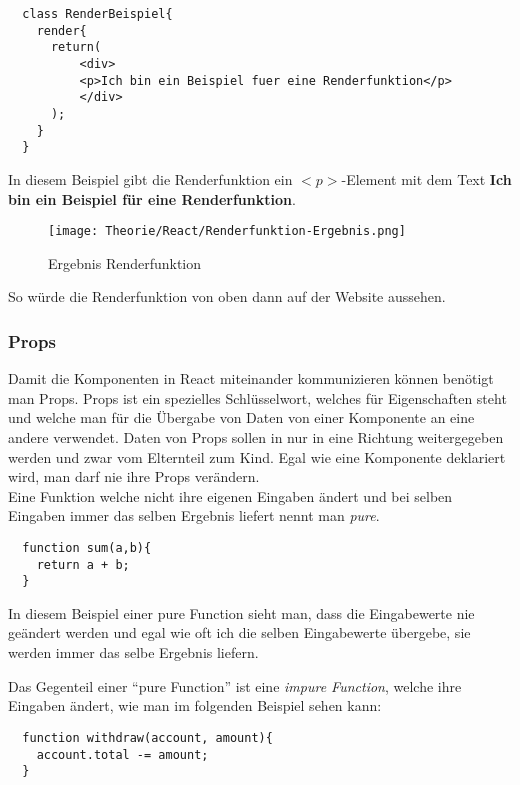 \begin{lstlisting}
  class RenderBeispiel{
    render{
      return(
          <div>
          <p>Ich bin ein Beispiel fuer eine Renderfunktion</p>
          </div>
      );
    }
  }
\end{lstlisting}

In diesem Beispiel gibt die Renderfunktion ein $<p>$-Element mit dem Text \textbf{Ich bin ein 
Beispiel für eine Renderfunktion}. 

\begin{figure}[H]
  \begin{center}
    \texttt{[image: Theorie/React/Renderfunktion-Ergebnis.png]}
    \caption{Ergebnis Renderfunktion}
  \end{center}
\end{figure}

So würde die Renderfunktion von oben dann auf der Website aussehen.

\subsubsection{Props}

 Damit die Komponenten in React miteinander kommunizieren können benötigt man Props. Props ist ein
 spezielles Schlüsselwort, welches für Eigenschaften steht und welche man für die Übergabe von 
 Daten von einer Komponente an eine andere verwendet. Daten von Props sollen in nur in eine 
 Richtung weitergegeben werden und zwar vom Elternteil zum Kind. Egal wie eine Komponente 
 deklariert wird, man darf nie ihre Props verändern.\\

 Eine Funktion welche nicht ihre eigenen Eingaben ändert und bei selben Eingaben immer das selben 
 Ergebnis liefert nennt man \textit{pure}.
\begin{lstlisting}
  function sum(a,b){
    return a + b;
  }
\end{lstlisting}
In diesem Beispiel einer pure Function sieht man, dass die Eingabewerte nie geändert werden und egal 
wie oft ich die selben Eingabewerte übergebe, sie werden immer das selbe Ergebnis liefern.\pagebreak


Das Gegenteil einer ``pure Function'' ist eine \textit{impure Function}, welche ihre Eingaben ändert, 
wie man im folgenden Beispiel sehen kann:
\begin{lstlisting}
  function withdraw(account, amount){
    account.total -= amount;
  }
\end{lstlisting}
~\cite{Props}